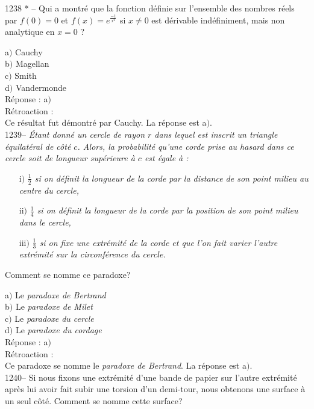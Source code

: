 ﻿\documentclass[letterpaper, 12pt]{article}
\begin{document}
1238 * -- Qui a montr\'e que la fonction d\'efinie sur l'ensemble
des nombres r\'eels par $f(0)=0$ et $f(x)=e^{\frac{-1}{x^2}}$ si
$x\not=0$ est d\'erivable ind\'efiniment, mais non analytique en
$x=0$ ?

a$)$ Cauchy \\
b$)$ Magellan \\
c$)$ Smith \\
d$)$ Vandermonde \\

R\'eponse : a$)$\\

R\'etroaction : \\
Ce r\'esultat fut d\'emontr\'e par Cauchy.
La r\'eponse est a$)$.\\

1239-- {\sl \'Etant donn\'e un cercle de rayon $r$ dans lequel est
inscrit un triangle \'equilat\'eral de c\^ot\'e $c$. Alors, la
probabilit\'e qu'une corde prise au hasard dans ce cercle soit de
longueur sup\'erieure \`a $c$ est \'egale \`a :}
\begin{enumerate}
\item[i$)$]{\sl $\frac12$ si on d\'efinit la longueur de la corde par la
distance de son point milieu au centre du cercle,}
\item[ii$)$]{\sl $\frac14$ si on d\'efinit la longueur de la corde par la
position de son point milieu dans le cercle,}
\item[iii$)$]{\sl $\frac13$ si on fixe une extr\'emit\'e de la corde et que
l'on fait varier l'autre extr\'emit\'e sur la circonf\'erence du cercle.}
\end{enumerate}
Comment se nomme ce paradoxe?

a$)$ Le {\sl paradoxe de Bertrand} \\
b$)$ Le {\sl paradoxe de Milet} \\
c$)$ Le {\sl paradoxe du cercle}  \\
d$)$ Le {\sl paradoxe du cordage}\\

R\'eponse : a$)$\\

R\'etroaction : \\
Ce paradoxe se nomme le {\sl paradoxe de Bertrand}.
La r\'eponse est a$)$.\\



1240-- Si nous fixons une extr\'emit\'e d'une bande de papier sur
l'autre extr\'emit\'e apr\`es lui avoir fait subir une torsion d'un
demi-tour, nous obtenons une surface \`a un seul c\^ot\'e. Comment
se nomme cette surface?
\end{document}
